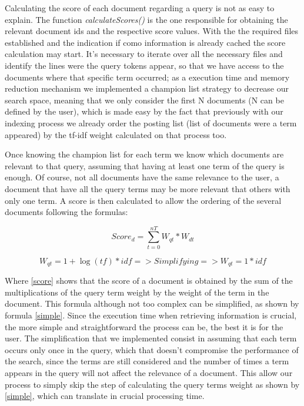 \documentclass[12pt]{article}
\begin{document}
Calculating the score of each document regarding a query is not as easy to explain. The function \textit{calculateScores()} is the one responsible for obtaining the relevant document ids and the respective score values. With the the required files established and the indication if como information is already cached the score calculation may start. It's necessary to iterate over all the necessary files and identify the lines were the query tokens appear, so that we have access to the documents where that specific term occurred; as a execution time and memory reduction mechanism we implemented a champion list strategy to decrease our search space, meaning that we only consider the first N documents (N can be defined by the user), which is made easy by the fact that previously with our indexing process we already order the posting list (list of documents were a term appeared) by the tf-idf weight calculated on that process too.

Once knowing the champion list for each term we know which documents are relevant to that query, assuming that having at least one term of the query is enough. Of course, not all documents have the same relevance to the user, a document that have all the query terms may be more relevant that others with only one term. A score is then calculated to allow the ordering of the several documents following the formulas:

\begin{equation}
  \label{score}
  Score_{d} = \sum_{t=0}^{nT} W_{qt} * W_{dt}
\end{equation}

\begin{equation}
  \label{simple}
  W_{qt} = 1 + \log(tf) * idf => Simplifying => W_{qt} = 1 * idf
\end{equation}

Where \ref{score} shows that the score of a document is obtained by the sum of the multiplications of the query term weight by the weight of the term in the document. This formula although not too complex can be simplified, as shown by formula \ref{simple}. Since the execution time when retrieving information is crucial, the more simple and straightforward the process can be, the best it is for the user. The simplification that we implemented consist in assuming that each term occurs only once in the query, which that doesn't compromise the performance of the search, since the terms are still considered and the number of times a term appears in the query will not affect the relevance of a document. This allow our process to simply skip the step of calculating the query terms weight as shown by \ref{simple}, which can translate in crucial processing time.
\end{document}
